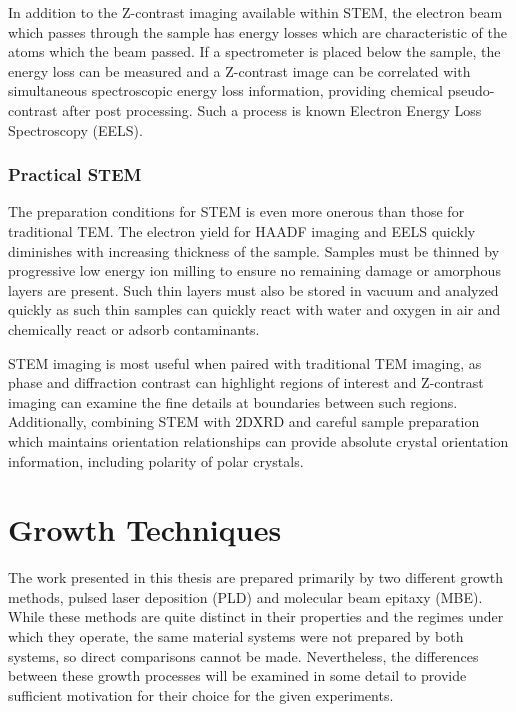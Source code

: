 In addition to the Z-contrast imaging available within STEM, the electron beam which passes through the sample has energy losses which are characteristic of the atoms which the beam passed.
If a spectrometer is placed below the sample, the energy loss can be measured and a Z-contrast image can be correlated with simultaneous spectroscopic energy loss information, providing chemical pseudo-contrast after post processing.
Such a process is known Electron Energy Loss Spectroscopy (EELS).

\subsubsection{Practical STEM} The preparation conditions for STEM is even more onerous than those for traditional TEM. The electron yield for HAADF imaging and EELS quickly diminishes with increasing thickness of the sample.
Samples must be thinned by progressive low energy ion milling to ensure no remaining damage or amorphous layers are present.
Such thin layers must also be stored in vacuum and analyzed quickly as such thin samples can quickly react with water and oxygen in air and chemically react or adsorb contaminants.

STEM imaging is most useful when paired with traditional TEM imaging, as phase and diffraction contrast can highlight regions of interest and Z-contrast imaging can examine the fine details at boundaries between such regions.
Additionally, combining STEM with 2DXRD and careful sample preparation which maintains orientation relationships can provide absolute crystal orientation information, including polarity of polar crystals.

\section{Growth Techniques}
The work presented in this thesis are prepared primarily by two different growth methods, pulsed laser deposition (PLD) and molecular beam epitaxy (MBE).
While these methods are quite distinct in their properties and the regimes under which they operate, the same material systems were not prepared by both systems, so direct comparisons cannot be made.
Nevertheless, the differences between these growth processes will be examined in some detail to provide sufficient motivation for their choice for the given experiments.
